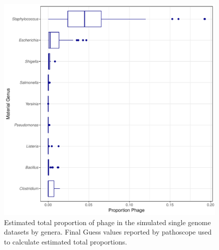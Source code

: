 \documentclass[fleqn,10pt,lineno]{wlpeerj}\usepackage[]{graphicx}\usepackage[]{color}
\makeatletter
\def\maxwidth{ %
  \ifdim\Gin@nat@width>\linewidth
    \linewidth
  \else
    \Gin@nat@width
  \fi
}
\newenvironment{knitrout}{}{} %
\makeatother
\begin{document}
\begin{knitrout}
\color{fgcolor}\begin{figure}
\includegraphics[width=\maxwidth]{figure/phage_prop-1} \caption[Estimated total proportion of phage in the simulated single genome datasets by genera]{Estimated total proportion of phage in the simulated single genome datasets by genera. Final Guess values reported by pathoscope used to calculate estimated total proportions.}\label{fig:phage_prop}
\end{figure}


\end{knitrout}
\end{document}
